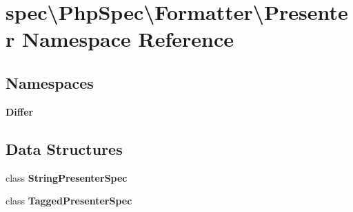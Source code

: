 \section{spec\textbackslash{}Php\+Spec\textbackslash{}Formatter\textbackslash{}Presenter Namespace Reference}
\label{namespacespec_1_1_php_spec_1_1_formatter_1_1_presenter}
\subsection*{Namespaces}
\begin{DoxyCompactItemize}
\item 
 {\bf Differ}
\end{DoxyCompactItemize}
\subsection*{Data Structures}
\begin{DoxyCompactItemize}
\item 
class {\bf String\+Presenter\+Spec}
\item 
class {\bf Tagged\+Presenter\+Spec}
\end{DoxyCompactItemize}
